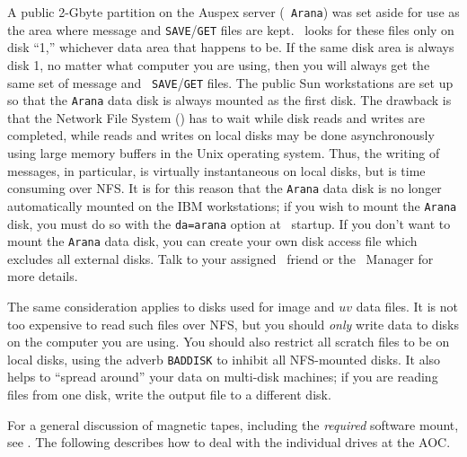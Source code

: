      A public 2-Gbyte  partition on the Auspex server ({\tt
Arana}) was set aside for use as the area where message and
{\tt SAVE}/{\tt GET} files are kept.  \AIPS\ looks for these files
only on disk ``1,'' whichever data area that happens to be.  If the
same disk area is always disk 1, no matter what computer you are
using, then you will always get the same set of message and {\tt
SAVE}/{\tt GET} files.  The public Sun workstations are set up so that
the {\tt Arana} data disk is always mounted as the first disk.  The
drawback is that the Network File System \hbox{()} has to
wait while disk reads and writes are completed, while reads and writes
on local disks may be done asynchronously using large memory buffers
in the Unix operating system.  Thus, the writing of messages, in
particular, is virtually instantaneous on local disks, but is time
consuming over \hbox{NFS}.  It is for this reason that the {\tt Arana}
data disk is no longer automatically mounted on the IBM workstations;
if you wish to mount the {\tt Arana} disk, you must do so with the
{\tt da=arana} option at \AIPS\ startup.  If you don't want to mount
the {\tt Arana} data disk, you can create your own disk access file
which excludes all external disks.  Talk to your assigned \AIPS\
friend or the \AIPS\ Manager for more details.

     The same consideration applies to disks used for image and $uv$
data files.  It is not too expensive to read such files over
\hbox{NFS}, but you should {\it only} write data to disks on the
computer you are using.  You should also restrict all scratch files to
be on local disks, using the adverb {\tt BADDISK} to inhibit all
NFS-mounted disks.  It also helps to ``spread around'' your data on
multi-disk machines; if you are reading files from one disk, write the
output file to a different disk.


    For a general discussion of magnetic tapes, including the {\it
required\/} software mount, see \Sec 2.4.  The following describes how
to deal with the individual \indx{tape} drives at the \hbox{AOC}.
\iodx{magnetic tape}


